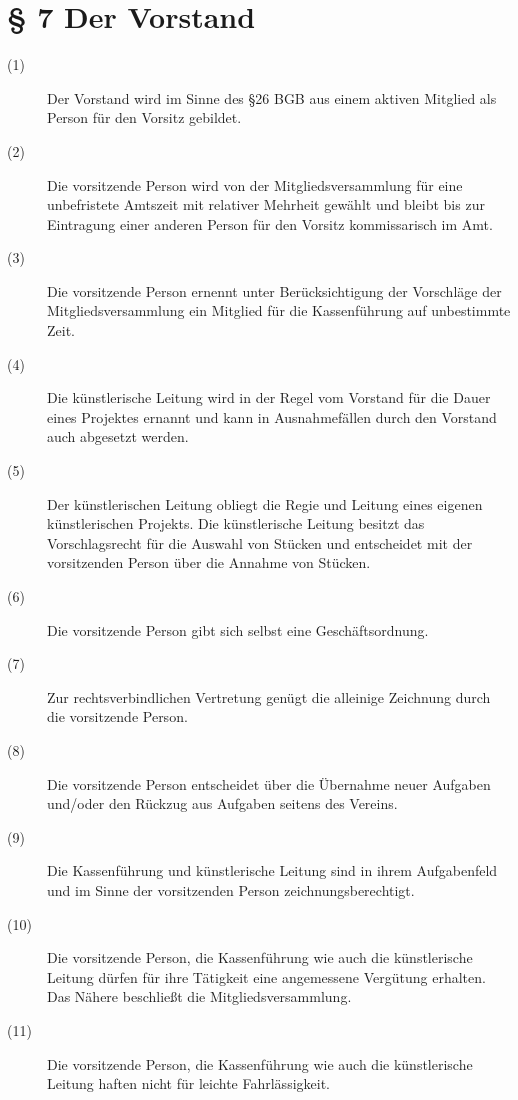 \documentclass[a4paper,12pt]{scrartcl}
\begin{document}
\section*{\S{} 7 Der Vorstand}
\begin{description} 

\item[(1)] Der Vorstand wird im Sinne des §26 BGB aus einem aktiven Mitglied als Person für den Vorsitz gebildet.
\item[(2)] Die vorsitzende Person wird von der Mitgliedsversammlung für eine unbefristete Amtszeit mit relativer Mehrheit gewählt und bleibt bis zur Eintragung einer anderen Person für den Vorsitz kommissarisch im Amt.
\item[(3)] Die vorsitzende Person ernennt unter Berücksichtigung der Vorschläge der Mitgliedsversammlung ein Mitglied für die Kassenführung auf unbestimmte Zeit.
\item[(4)] Die künstlerische Leitung wird in der Regel vom Vorstand für die Dauer eines Projektes ernannt und kann in Ausnahmefällen durch den Vorstand auch abgesetzt werden.
\item[(5)] Der künstlerischen Leitung obliegt die Regie und Leitung eines eigenen künstlerischen Projekts. Die künstlerische Leitung besitzt das Vorschlagsrecht für die Auswahl von Stücken und entscheidet mit der vorsitzenden Person über die Annahme von Stücken.
\item[(6)] Die vorsitzende Person gibt sich selbst eine Geschäftsordnung.
\item[(7)] Zur rechtsverbindlichen Vertretung genügt die alleinige Zeichnung durch die vorsitzende Person.
\item[(8)] Die vorsitzende Person entscheidet über die Übernahme neuer Aufgaben und/oder den Rückzug aus Aufgaben seitens des Vereins.
\item[(9)] Die Kassenführung und künstlerische Leitung sind in ihrem Aufgabenfeld und im Sinne der vorsitzenden Person zeichnungsberechtigt.
\item[(10)] Die vorsitzende Person, die Kassenführung wie auch die künstlerische Leitung dürfen für ihre Tätigkeit eine angemessene Vergütung erhalten. Das Nähere beschließt die Mitgliedsversammlung.
\item[(11)] Die vorsitzende Person, die Kassenführung wie auch die künstlerische Leitung haften nicht für leichte Fahrlässigkeit.

\end{description}
\end{document}
